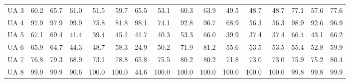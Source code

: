 \documentclass[a4paper,10pt,DIV=16]{scrartcl}
\begin{document}
\begin{table}[h]
\begin{tabular}{lrrrrrrrrrrrrrrr}
    UA 3 & 60.2 & 65.7 & 61.0 & 51.5 & 59.7 & 65.5 & 53.1 & 60.3 & 63.9 & 49.5 & 48.7 & 48.7 & 77.1 & 57.6 & 77.6 \\
    UA 4 & 97.9 & 97.9 & 99.9 & 75.8 & 81.8 & 98.1 & 74.1 & 92.8 & 96.7 & 68.9 & 56.3 & 56.3 & 98.9 & 92.6 & 96.9 \\
    UA 5 & 67.1 & 69.4 & 41.4 & 39.4 & 45.1 & 41.7 & 40.3 & 53.3 & 66.0 & 39.9 & 37.4 & 37.4 & 66.4 & 43.1 & 66.2 \\
    UA 6 & 65.9 & 64.7 & 44.3 & 48.7 & 58.3 & 24.9 & 50.2 & 71.9 & 81.2 & 55.6 & 53.5 & 53.5 & 55.4 & 52.8 & 59.9 \\
    UA 7 & 76.8 & 79.3 & 68.9 & 73.1 & 78.8 & 65.8 & 75.5 & 80.2 & 80.2 & 71.8 & 73.0 & 73.0 & 75.9 & 75.2 & 80.4 \\
    UA 8 & 99.9 & 99.9 & 90.6 & 100.0 & 100.0 & 44.6 & 100.0 & 100.0 & 100.0 & 100.0 & 100.0 & 100.0 & 99.8 & 99.8 & 99.9 \\
  \end{tabular}
\end{table}
\end{document}
